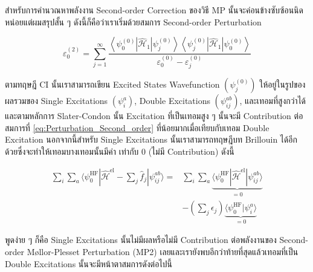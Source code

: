 สำหรับการคำนวณหาพลังงาน Second-order Correction ของวิธี MP นั้นจะค่อนข้างซับซ้อนนิดหน่อยแต่ผมสรุปสั้น ๆ ดังนี้ก็คือว่าเราเริ่มด้วยสมการ
Second-order Perturbation

\begin{equation}
    \label{eq:Perturbation_Second_order}
    \varepsilon_{0}^{(2)}
    =
    \sum_{j=1}^{\infty}
    \frac
    {
        \left\langle
        \psi_{0}^{(0)} \left|\hat{\mathscr{H}}_{1}\right| \psi_{j}^{(0)}
        \right\rangle
        \left\langle
        \psi_{j}^{(0)} \left|\hat{\mathscr{H}}_{1}\right| \psi_{0}^{(0)}
        \right\rangle
    }
    {
        \varepsilon_{0}^{(0)}-\varepsilon_{j}^{(0)}
    }
\end{equation}

\noindent ตามทฤษฎี CI นั้นเราสามารถเขียน Excited States Wavefunction $(\psi_{j}^{(0)})$ ให้อยู่ในรูปของผลรวมของ Single
Excitations $(\psi_{i}^{a})$, Double Excitations $(\psi_{i j}^{a b})$, และเทอมที่สูงกว่าได้ และตามหลักการ Slater-Condon
นั้น Excitation ที่เป็นเทอมสูง ๆ นั้นจะมี Contribution ต่อสมการที่ \eqref{eq:Perturbation_Second_order} ที่น้อยมากเมื่อเทียบกับเทอม
Double Excitation นอกจากนี้สำหรับ Single Excitations นั้นเราสามารถทฤษฎีบท Brillouin ได้อีกด้วยซึ่งจะทำให้เทอมบางเทอมนั้นมีค่า%
เท่ากับ 0 (ไม่มี Contribution) ดังนี้

\begin{equation}
    \begin{aligned}
        \sum_{i} \sum_{a}
        \langle\psi_{0}^{\mathrm{HF}} | \hat{\mathscr{H}}^{\mathrm{el}}
        - \sum_{j} \hat{f}_{j} | \psi_{i j}^{a b}\rangle
        = & \sum_{i} \sum_{a}
        \underbrace{\langle\psi_{0}^{\mathrm{HF}}
        | \hat{\mathscr{H}}^{\mathrm{el}} |
        \psi_{i j}^{a b}\rangle}_
        {= 0}                                      \\
          & - \left( \sum_{j} \epsilon_{j} \right)
        \underbrace{\langle\psi_{0}^{\mathrm{HF}} | \psi_{i}^{a} \rangle}_{= 0}
    \end{aligned}
\end{equation}

\noindent พูดง่าย ๆ ก็คือ Single Excitations นั้นไม่มีผลหรือไม่มี Contribution ต่อพลังงานของ Second-order M\o{}llor-Plesset
Perturbation (MP2) เลยและเรายังพบอีกว่าท้ายที่สุดแล้วเทอมที่เป็น Double Excitations นั้นจะมีหน้าตาสมการดังต่อไปนี้


